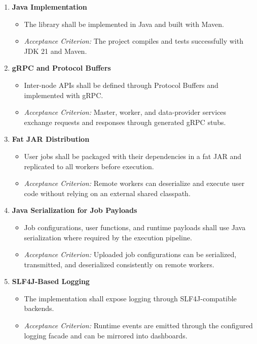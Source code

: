 \documentclass{scrartcl}
\begin{document}
\begin{enumerate}[label=\textbf{IR-\arabic*}]
    \item \textbf{Java Implementation}
          \begin{itemize}
              \item The library shall be implemented in Java and built with Maven.
              \item \textit{Acceptance Criterion:} The project compiles and tests successfully with JDK 21 and Maven.
          \end{itemize}

    \item \textbf{gRPC and Protocol Buffers}
          \begin{itemize}
              \item Inter-node APIs shall be defined through Protocol Buffers and implemented with gRPC.
              \item \textit{Acceptance Criterion:} Master, worker, and data-provider services exchange requests and responses through generated gRPC stubs.
          \end{itemize}

    \item \textbf{Fat JAR Distribution}
          \begin{itemize}
              \item User jobs shall be packaged with their dependencies in a fat JAR and replicated to all workers before execution.
              \item \textit{Acceptance Criterion:} Remote workers can deserialize and execute user code without relying on an external shared classpath.
          \end{itemize}

    \item \textbf{Java Serialization for Job Payloads}
          \begin{itemize}
              \item Job configurations, user functions, and runtime payloads shall use Java serialization where required by the execution pipeline.
              \item \textit{Acceptance Criterion:} Uploaded job configurations can be serialized, transmitted, and deserialized consistently on remote workers.
          \end{itemize}

    \item \textbf{SLF4J-Based Logging}
          \begin{itemize}
              \item The implementation shall expose logging through SLF4J-compatible backends.
              \item \textit{Acceptance Criterion:} Runtime events are emitted through the configured logging facade and can be mirrored into dashboards.
          \end{itemize}


\end{enumerate}
\end{document}
